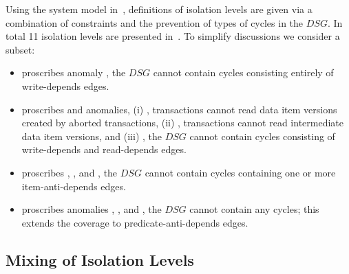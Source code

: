 Using the system model in~, definitions of isolation levels are given via a combination of constraints and the 
prevention of
types of cycles in the $DSG$. In total 11 isolation levels are presented
in~\cite{adya1999weak}. To simplify discussions we consider a subset:
\begin{itemize}
\item {} proscribes anomaly ,
  the $DSG$ cannot contain cycles consisting entirely of write-depends edges.
\item {} proscribes  and anomalies,
  (i) , transactions cannot read data item versions
  created by aborted transactions,
  (ii) , transactions cannot read intermediate data item versions, and
  (iii) , the $DSG$ cannot contain cycles
  consisting of write-depends and read-depends edges.
\item {} proscribes , , and , the $DSG$ cannot contain cycles
  containing one or more item-anti-depends edges.
\item {} proscribes anomalies , ,
  and , the $DSG$ cannot contain any cycles; this extends the coverage to
  predicate-anti-depends edges.
\end{itemize}

\subsection{Mixing of Isolation Levels}
\label{sec:mixing}

